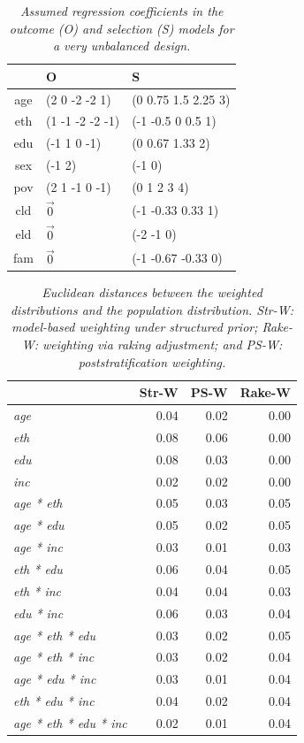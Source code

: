 \documentclass[11pt]{article}
\numberwithin{figure}{section}
\numberwithin{table}{section}
\numberwithin{equation}{section}
\begin{document}
\begin{table}
\begin{center}
\caption{\em Assumed regression coefficients in the outcome (O) and selection (S) models for a very unbalanced design.}
\label{s2-design-case2}
\small
\begin{tabular}{c|p{7cm}|p{7cm}}
&O&S\\
\hline
age&(2 0 -2 -2 1)&(0 0.75 1.5 2.25 3)\\
eth&(1 -1 -2 -2 -1)&(-1 -0.5 0 0.5 1)\\
edu&(-1 1 0 -1)&(0 0.67 1.33 2)\\
sex&(-1 2)&(-1 0)\\
pov&(2 1 -1 0 -1)&(0 1 2 3 4)\\
cld&$\vec{0}$&(-1 -0.33 0.33 1)\\
eld&$\vec{0}$&(-2 -1 0)\\
fam&$\vec{0}$&(-1 -0.67 -0.33 0)
\end{tabular}
\end{center}
\end{table}



\begin{table}
\centering
\caption{\em Euclidean distances between the weighted distributions and the population distribution. Str-W: model-based weighting under structured prior; Rake-W: weighting via raking adjustment; and PS-W: poststratification weighting. }
\label{prob-dist}
\small
\begin{tabular}{lrrr}
 & Str-W & PS-W & Rake-W \\ 
 \hline
 {\em age} & 0.04 & 0.02 & 0.00\\
 {\em eth}& 0.08 & 0.06 & 0.00 \\ 
{\em edu} & 0.08 & 0.03 & 0.00 \\ 
{\em inc}& 0.02 & 0.02 & 0.00\\ 

{\em age * eth}& 0.05 & 0.03 & 0.05 \\
{\em age * edu}& 0.05 & 0.02 & 0.05 \\
{\em age * inc}& 0.03 & 0.01 & 0.03 \\

{\em eth * edu} & 0.06 & 0.04 & 0.05 \\ 
{\em eth * inc}& 0.04 & 0.04 & 0.03 \\ 
{\em edu * inc} & 0.06 & 0.03 & 0.04 \\ 

{\em age * eth * edu}& 0.03 & 0.02 & 0.05 \\ 
{\em age * eth * inc}& 0.03 & 0.02 & 0.04 \\
{\em age * edu * inc } & 0.03 & 0.01 & 0.04 \\
{\em eth * edu * inc} &0.04 & 0.02 & 0.04 \\
{\em age * eth * edu * inc}& 0.02 & 0.01& 0.04
\end{tabular}
\end{table}
\end{document}
